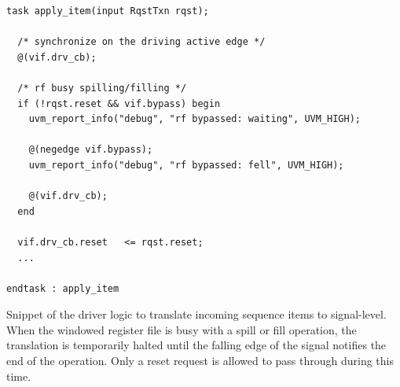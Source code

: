 \begin{listing}
\begin{verbatim}
task apply_item(input RqstTxn rqst);

  /* synchronize on the driving active edge */
  @(vif.drv_cb);

  /* rf busy spilling/filling */
  if (!rqst.reset && vif.bypass) begin
    uvm_report_info("debug", "rf bypassed: waiting", UVM_HIGH);

    @(negedge vif.bypass);
    uvm_report_info("debug", "rf bypassed: fell", UVM_HIGH);

    @(vif.drv_cb);
  end

  vif.drv_cb.reset   <= rqst.reset;
  ...
  
endtask : apply_item
\end{verbatim}
\caption{Snippet of the driver logic to translate incoming sequence items to signal-level. When the windowed register file is busy with a spill or fill operation, the translation is temporarily halted until the falling edge of the  signal notifies the end of the operation. Only a reset request is allowed to pass through during this time.}
\label{list:wrf_drv}
\end{listing}


